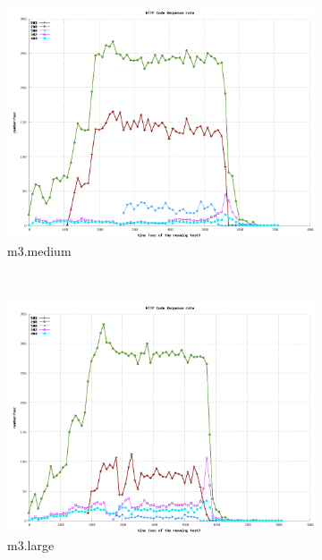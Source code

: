 \documentclass[dvips,12pt]{article}
\begin{document}
\begin{figure}[h!]
    \centering
    \begin{subfigure}[b]{0.3\textwidth}
        \includegraphics[width=\textwidth]{images/vertical/http_code_medium.png}
        \caption{m3.medium}
    \end{subfigure}
    ~ 
    \begin{subfigure}[b]{0.3\textwidth}
        \includegraphics[width=\textwidth]{images/vertical/http_code_large.png}
        \caption{m3.large}
    \end{subfigure}
    ~ 
    \begin{subfigure}[b]{0.3\textwidth}

\end{subfigure}
\end{figure}
\end{document}
